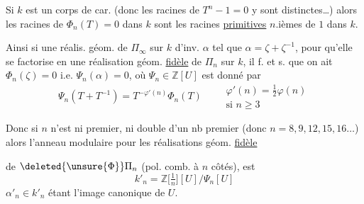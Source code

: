 Si $k$ est un corps de car.  (donc les racines de
$T^n-1=0$ y sont distinctes\ldots) alors les racines de
$\Phi_n(T)=0$ dans $k$ sont les racines \uline{primitives} $n$.ièmes
de $1$ dans $k$.

Ainsi si   une réalis. 
géom.  de $\Pi_\infty$ sur $k$
d'inv. $\alpha$ tel que $\alpha=\zeta+\zeta^{-1}$,
pour qu'elle se factorise en une réalisation géom.
\uline{fidèle} de $\Pi_n$ sur $k$,  il f. et s. que on ait
$\Phi_n(\zeta)=0$ i.e. $\Psi_n(\alpha)=0$, où $\Psi_n\in\mathbb Z[U]$ est
donné par
\[
\Psi_n(T+T^{-1})=T^{-\varphi'(n)}\Phi_n(T)
\qquad\substack{\varphi'(n)=\tfrac12\varphi(n)\\ \text{si }n\geq 3}
\]

Donc si $n$  n'est ni premier, ni double d'un 
nb premier (donc $n=8,9,12,15,16\ldots$) alors l'anneau
modulaire pour les réalisations géom. \uline{fidèle}
\par\noindent{}

de $\deleted{\unsure{\Phi}}\Pi_n$ (pol. comb. à $n$ côtés),  est
\[
k'_n=\mathbb Z\bigl[\tfrac1n\bigr][U]/\Psi_n[U]
\]
$\alpha'_n\in k'_n$ étant l'image canonique de $U$.

